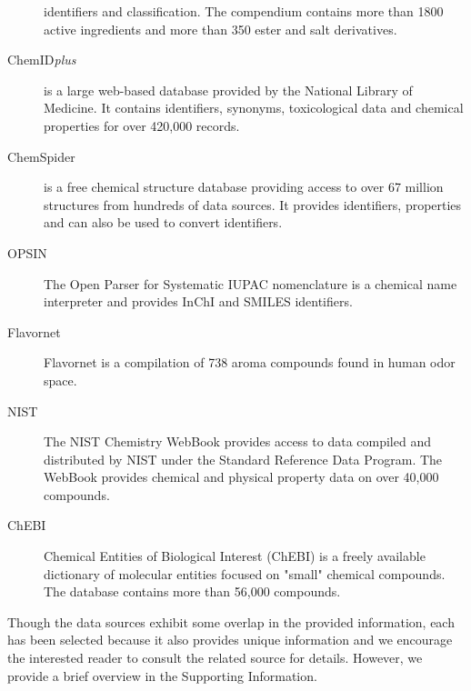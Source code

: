 \documentclass[article]{jss}
\begin{document}
\begin{description}
{    identifiers and classification. The compendium contains more than 1800 active ingredients and more than 350 ester and salt derivatives. }
\item[ChemID\emph{plus}]{\citep{Tomasulo_2002} is a large web-based
    database provided by the National Library of Medicine. It contains
    identifiers, synonyms, toxicological data and chemical
    properties for over 420,000 records.}
\item[ChemSpider]{\citep{pence_chemspider:_2010} is a free chemical
    structure database providing access to over 67 million
    structures from hundreds of data sources. It provides identifiers, properties and can also be
    used to convert identifiers.}
\item[OPSIN]{\citep{Lowe_Corbett_Murray-Rust_Glen_2011} The Open
    Parser for Systematic IUPAC nomenclature is a chemical name
    interpreter and provides InChI and SMILES identifiers.}
\item[Flavornet]{\citep{flavornet} Flavornet is a compilation of 738 aroma compounds found in human odor space.}
\item[NIST]{\citep{nist} The NIST Chemistry WebBook provides access to data compiled and distributed by NIST under the Standard Reference Data Program. The WebBook provides chemical and physical property data on over 40,000 compounds.}
\item[ChEBI]{\citep{chebi} Chemical Entities of Biological Interest (ChEBI) is a freely available dictionary of molecular entities focused on "small" chemical compounds. The database contains more than 56,000 compounds.}

\end{description}

Though the data sources exhibit some overlap in the provided
information, each has been selected because it also provides unique
information and we encourage the interested reader to consult the
related source for details.  However, we provide a brief overview in
the Supporting Information.
\end{document}
